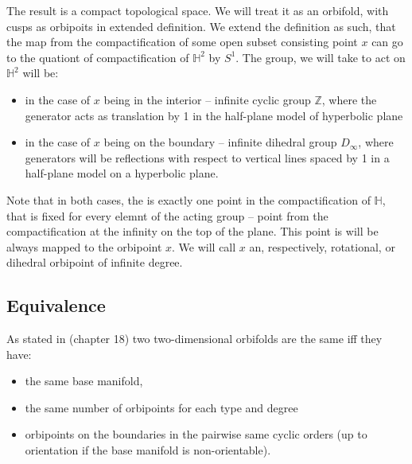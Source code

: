 The result is a compact topological space. We will treat it as an orbifold, with 
cusps as orbipoits in extended definition. 
We extend the definition as such, that the map from the compactification of 
some open subset consisting point $x$ can go to the quationt of compactification of 
$\mathbb{H}^2$ by $S^1$. The group, we will take to act on $\mathbb{H}^2$ will 
be:
\begin{itemize} 
\item in the case of $x$ being in the interior -- infinite cyclic group $\mathbb{Z}$, 
where the generator acts as translation by 1 
in the half-plane model of hyperbolic plane   
\item in the case of $x$ being on the boundary -- infinite dihedral group $D_\infty$, where 
generators will be reflections with respect to vertical lines spaced by 1 in a half-plane 
model on a hyperbolic plane.
\end{itemize}

Note that in both cases, the is exactly one point in the compactification of $\mathbb{H}$, that is 
fixed for every elemnt of the acting group -- point from the compactification at 
the infinity on the top of the plane. This point is will be always mapped to the orbipoint $x$. 
We will call $x$ an, respectively, rotational, or dihedral orbipoint of infinite degree.


\subsection{Equivalence}\label{sameness}
As stated in \cite{Conway16} (chapter 18) two two-dimensional orbifolds are the same iff they have:
\begin{itemize}
\item the same base manifold, 
\item the same number of orbipoints for each type and degree 
\item orbipoints on the boundaries 
in the pairwise same cyclic orders (up to orientation if the base manifold is non-orientable).
\end{itemize}

